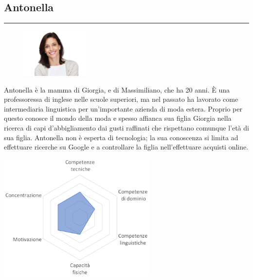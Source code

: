 \documentclass[12pt,a4paper]{report}
\begin{document}
\subsection*{Antonella}
\rule{\textwidth}{0.5pt}
\begin{figure}
  \centering
    \includegraphics[width=0.3\textwidth]{"Images Latex/Personas/Antonella"}
\end{figure}
Antonella è la mamma di Giorgia, e di Massimiliano, che ha 20 anni. È una professoressa di inglese nelle scuole superiori, ma nel passato ha lavorato come intermediaria linguistica per un'importante azienda di moda estera. Proprio per questo conosce il mondo della moda e spesso affianca sua figlia Giorgia nella ricerca di capi d'abbigliamento dai gusti raffinati che rispettano comunque l'età di sua figlia. Antonella non è esperta di tecnologia; la sua conoscenza si limita ad effettuare ricerche su Google e a controllare la figlia nell'effettuare acquisti online.
\begin{center}
  \includegraphics[width=0.6\textwidth]{"Images Latex/Personas/Antonella45"}
\end{center}
\newpage
\end{document}
